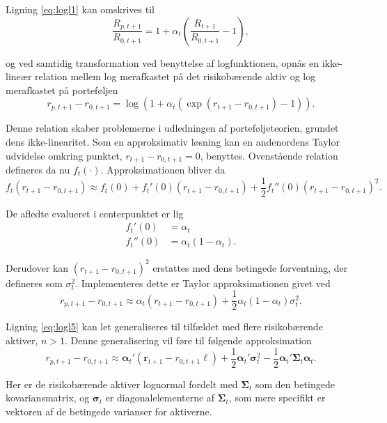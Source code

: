 \documentclass[
  a4paper,
  oneside]{memoir}
\begin{document}
Ligning \eqref{eq:logl1} kan omskrives til
\begin{equation}
\frac{R_{p,t+1}}{R_{0,t+1}} = 1 + \alpha_t \left(\frac{R_{t+1}}{R_{0,t+1}}-1\right), \label{eq:logl2}
\end{equation}

og ved samtidig transformation ved benyttelse af logfunktionen, opnås en ikke-lineær relation mellem log merafkastet på det risikobærende aktiv og log merafkastet på porteføljen
\begin{equation}
r_{p,t+1} - r_{0,t+1} = \log \left(1+\alpha_t (\exp(r_{t+1}-r_{0,t+1})-1)\right). \label{eq:logl3}
\end{equation}

Denne relation skaber problemerne i udledningen af porteføljeteorien, grundet dens ikke-linearitet. Som en approksimativ løsning kan en andenordens Taylor udvidelse omkring punktet, \(r_{t+1}-r_{0,t+1}=0\), benyttes. Ovenstående relation defineres da nu \(f_t(\cdot)\). Approksimationen bliver da
\begin{equation}
f_t(r_{t+1}-r_{0,t+1})\approx f_t(0) + f_t'(0)(r_{t+1}-r_{0,t+1})+\frac{1}{2}f_t''(0)(r_{t+1}-r_{0,t+1})^2. \label{eq:logl4}
\end{equation}

De afledte evalueret i centerpunktet er lig
\begin{align*}
f_t'(0) &= \alpha_t\\
f_t''(0) &= \alpha_t(1-\alpha_t).
\end{align*}

Derudover kan \((r_{t+1}-r_{0,t+1})^2\) erstattes med dens betingede forventning, der defineres som \(\sigma_t^2\). Implementeres dette er Taylor approksimationen givet ved
\begin{equation}
r_{p,t+1} - r_{0,t+1} \approx \alpha_t(r_{t+1} - r_{0,t+1}) + \frac{1}{2} \alpha_t(1-\alpha_t)\sigma_t^2. \label{eq:logl5}
\end{equation}

Ligning \eqref{eq:logl5} kan let generaliseres til tilfældet med flere risikobærende aktiver, \(n>1\). Denne generalisering vil føre til følgende approksimation
\begin{equation}
r_{p,t+1} - r_{0,t+1} \approx \bm{\alpha}_t'(\bm{r}_{t+1} - r_{0,t+1}\bm{\ell}) + \frac{1}{2} \bm{\alpha}_t'\bm{\sigma}_t^2 - \frac{1}{2}\bm{\alpha}_t'\bm{\Sigma}_t\bm{\alpha}_t. \label{eq:logl6}
\end{equation}

Her er de risikobærende aktiver lognormal fordelt med \(\bm{\Sigma}_t\) som den betingede kovariansmatrix, og \(\bm{\sigma}_t\) er diagonalelementerne af \(\bm{\Sigma}_t\), som mere specifikt er vektoren af de betingede varianser for aktiverne.
\end{document}
